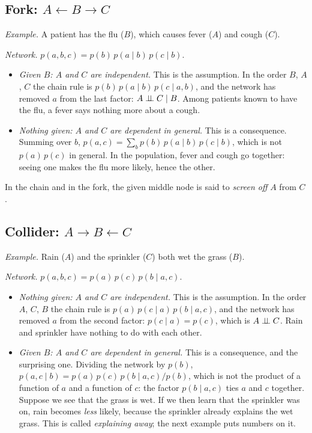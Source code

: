 \subsection*{Fork: $A\leftarrow B\rightarrow C$}

\emph{Example.} A patient has the flu ($B$), which causes fever ($A$) and
cough ($C$).

\emph{Network.} $p(a,b,c)=p(b)\,p(a\mid b)\,p(c\mid b)$.
\begin{itemize}[nosep]
  \item \emph{Given $B$: $A$ and $C$ are independent.} This is the assumption. In the
    order $B$, $A$, $C$ the chain rule is
    $p(b)\,p(a\mid b)\,p(c\mid a,b)$, and the network has removed $a$ from
    the last factor: $A\mathrel{\perp\!\!\!\perp} C\mid B$. Among patients known to have the
    flu, a fever says nothing more about a cough.
  \item \emph{Nothing given: $A$ and $C$ are dependent in general.} This is a consequence.
    Summing over $b$, $p(a,c)=\sum_bp(b)\,p(a\mid b)\,p(c\mid b)$, which
    is not $p(a)\,p(c)$ in general. In the population, fever and cough go
    together: seeing one makes the flu more likely, hence the other.
\end{itemize}
In the chain and in the fork, the given middle node is said to
\emph{screen off} $A$ from $C$.

\subsection*{Collider: $A\rightarrow B\leftarrow C$}

\emph{Example.} Rain ($A$) and the sprinkler ($C$) both wet the grass
($B$).

\emph{Network.} $p(a,b,c)=p(a)\,p(c)\,p(b\mid a,c)$.
\begin{itemize}[nosep]
  \item \emph{Nothing given: $A$ and $C$ are independent.} This is the assumption. In the
    order $A$, $C$, $B$ the chain rule is
    $p(a)\,p(c\mid a)\,p(b\mid a,c)$, and the network has removed $a$ from
    the second factor: $p(c\mid a)=p(c)$, which is $A\mathrel{\perp\!\!\!\perp} C$. Rain and
    sprinkler have nothing to do with each other.
  \item \emph{Given $B$: $A$ and $C$ are dependent in general.} This is a consequence, and
    the surprising one. Dividing the network by $p(b)$,
    $p(a,c\mid b)=p(a)\,p(c)\,p(b\mid a,c)/p(b)$, which is not the product
    of a function of $a$ and a function of $c$: the factor
    $p(b\mid a,c)$ ties $a$ and $c$ together. Suppose we see that the
    grass is wet. If we then learn that the sprinkler was on, rain becomes
    \emph{less} likely, because the sprinkler already explains the wet
    grass. This is called \emph{explaining away}; the next example puts
    numbers on it.
\end{itemize}


